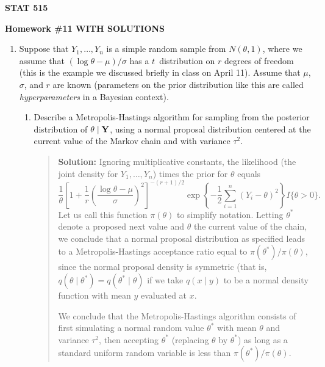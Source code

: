 \documentclass{article}
\def\vec#1{\mathchoice{\mbox{\boldmath$\displaystyle\bf#1$}}
{\mbox{\boldmath$\textstyle\bf#1$}}
{\mbox{\boldmath$\scriptstyle\bf#1$}}
{\mbox{\boldmath$\scriptscriptstyle\bf#1$}}}
\begin{document}
\begin{center}
{\bf STAT 515}

{\bf Homework \#11 WITH SOLUTIONS}

\end{center}

\begin{enumerate}

  \item Suppose that $Y_1, \ldots, Y_n$ is a simple random sample from
  $N(\theta, 1)$, where we assume that $(\log \theta-\mu)/\sigma$ has a
  $t$~distribution on $r$ degrees of freedom (this is the example we discussed
  briefly in class on April 11). Assume that $\mu$, $\sigma$, and $r$ are known
  (parameters on the prior distribution like this are called {\em
  hyperparameters} in a Bayesian context).
  
    \begin{enumerate}

      \item Describe a Metropolis-Hastings algorithm for sampling from the
      posterior distribution of $\theta\mid \vec Y$, using a normal proposal
      distribution centered at the current value of the Markov chain and with
      variance $\tau^2$.
      \begin{quotation}{\bf Solution:}
      Ignoring multiplicative constants, the likelihood (the joint density for $Y_1, \ldots, Y_n$)
      times the prior for $\theta$ equals
      \[
      \frac1\theta \left[ 1 + \frac1r \left( \frac{\log \theta - \mu}{\sigma} \right)^2 \right] ^{-(r+1)/2} \exp \left\{
      -\frac12 \sum_{i=1}^n (Y_i -\theta)^2 \right\} I\{ \theta>0\}.
      \]
      Let us call this function $\pi(\theta)$ to simplify notation.
      Letting $\theta^*$ denote a proposed next value and $\theta$ the current value of the
      chain, we conclude that a normal proposal distribution as specified leads to a Metropolis-Hastings
      acceptance ratio equal to $\pi(\theta^*)/\pi(\theta)$, since the normal proposal
      density is symmetric (that is, $q(\theta \mid \theta^*)=q(\theta^*\mid \theta)$ if we take
      $q(x \mid y)$ to be a normal density function with mean $y$ evaluated at $x$.
      
      We conclude that the Metropolis-Hastings algorithm consists of first simulating a normal
      random value $\theta^*$ with mean $\theta$ and variance $\tau^2$, then accepting 
      $\theta^*$ (replacing $\theta$ by $\theta^*$) as long as a standard uniform random variable
      is less than $\pi(\theta^*)/\pi(\theta)$.  
      

\end{quotation}
\end{enumerate}
\end{enumerate}
\end{document}
